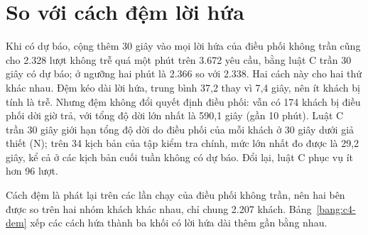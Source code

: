 \section{So với cách đệm lời hứa}
\label{muc:c4-dem}

Khi có dự báo, cộng thêm 30 giây vào mọi lời hứa của điều phối không trần cũng cho 2.328 lượt không trễ quá một phút
trên 3.672 yêu cầu, bằng luật C trần 30 giây có dự báo; ở ngưỡng hai phút là 2.366 so với 2.338. Hai cách này cho hai
thứ khác nhau. Đệm kéo dài lời hứa, trung bình 37,2 thay vì 7,4 giây, nên ít khách bị tính là trễ. Nhưng đệm không đổi
quyết định điều phối: vẫn có 174 khách bị điều phối dời giờ trả, với tổng độ dời lớn nhất là 590,1 giây (gần 10 phút).
Luật C trần 30 giây giới hạn tổng độ dời do điều phối của mỗi khách ở 30 giây dưới giả thiết (N); trên 34 kịch bản của
tập kiểm tra chính, mức lớn nhất đo được là 29,2 giây, kể cả ở các kịch bản cuối tuần không có dự báo. Đổi lại, luật C
phục vụ ít hơn 96 lượt.

Cách đệm là phát lại trên các lần chạy của điều phối không trần, nên hai bên được so trên hai nhóm khách khác nhau, chỉ
chung 2.207 khách. Bảng~\ref{bang:c4-dem} xếp các cách hứa thành ba khối có lời hứa dài thêm gần bằng nhau.

